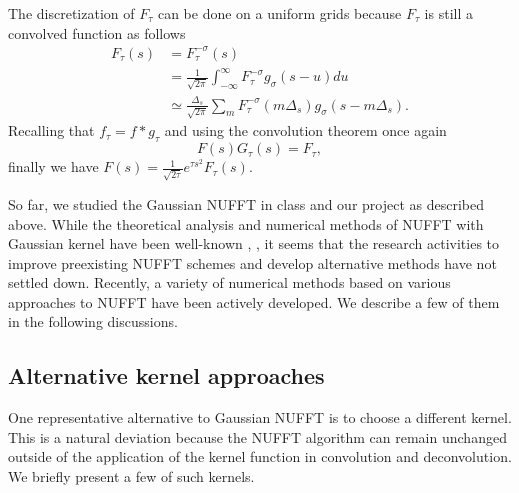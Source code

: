 The discretization of $F_{\tau}$ can be done on a uniform grids because $F_{\tau}$ is still a convolved function as follows
\begin{align}
     F_{\tau}(s)
  &= F_{\tau}^{-\sigma}(s) \\
  &= \frac{1}{\sqrt{2\pi}}\int_{-\infty}^{\infty}F_{\tau}^{-\sigma}g_{\sigma}(s-u)du \\
  &\simeq \frac{\Delta_{s}}{\sqrt{2\pi}}\sum_{m}^{}F_{\tau}^{-\sigma}(m\Delta_{s})
          g_{\sigma}(s - m\Delta_{s}).
\end{align}
Recalling that $f_{\tau} = f\ast g_{\tau}$ and using the convolution theorem once again
\begin{equation}
  F(s)G_{\tau}(s) = F_{\tau},
\end{equation}
finally we have $F(s) = \frac{1}{\sqrt{2\tau}}e^{\tau s^2}F_{\tau}(s)$.

So far, we studied the Gaussian NUFFT in class and our project as described above.
While the theoretical analysis and numerical methods of NUFFT with Gaussian kernel have been well-known \cite{SISC-1993-Dutt-Rokhlin}, \cite{SIAM-Rev-2004-Greengard}, it seems that the research activities to improve preexisting NUFFT schemes and develop alternative methods have not settled down.
Recently, a variety of numerical methods based on various approaches to NUFFT have been actively developed.
We describe a few of them in the following discussions.

\subsection{Alternative kernel approaches}
One representative alternative to Gaussian NUFFT is to choose a different kernel.
This is a natural deviation because the NUFFT algorithm can remain unchanged outside of the application of the kernel function in convolution and deconvolution.
We briefly present a few of such kernels.

